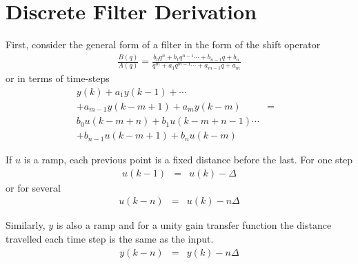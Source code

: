 \documentclass[10pt,letterpaper]{article}
\begin{document}
\section*{Discrete Filter Derivation}
First, consider the general form of a filter in the form of the shift operator
\begin{eqnarray}
\frac{B(q)}{A(q)}=\frac{b_0q^n + b_1q^{n-1}\cdots + b_{n-1}q + b_n}
                       {q^m + a_1q^{m-1}\cdots + a_{m-1}q + a_m}
\end{eqnarray}
or in terms of time-steps
\begin{eqnarray}
y(k) + a_1y(k-1) + \cdots && \nonumber \\
+ a_{m-1}y(k-m+1) + a_my(k-m) &=& \nonumber \\
b_0u(k-m+n) + b_1u(k-m+n-1)\cdots && \nonumber \\
+ b_{n-1}u(k-m+1) + b_nu(k-m) &&
\label{eqn:timestep}
\end{eqnarray}

If $u$ is a ramp, each previous point is a fixed distance before the last. For one step
\begin{eqnarray}
u(k-1) &=&  u(k) - \Delta
\end{eqnarray}
or for several
\begin{eqnarray}
u(k-n) &=&  u(k) - n\Delta
\end{eqnarray}

Similarly, $y$ is also a ramp and for a unity gain transfer function the distance travelled each time step is the same as the input.
\begin{eqnarray}
y(k-n) &=&  y(k) - n\Delta
\end{eqnarray}
\end{document}
